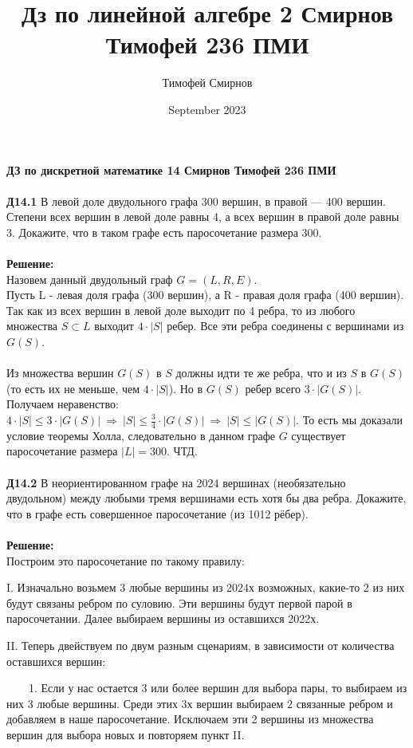 \documentclass[a4paper, 12pt]{article}
\title{Дз по линейной алгебре 2 Смирнов Тимофей 236 ПМИ}
\author{Тимофей Смирнов}
\date{September 2023}
\begin{document}
    {\center \bf \large ДЗ по дискретной математике 14 Смирнов Тимофей 236 ПМИ}
    \\
    \\ \textbf{Д14.1} В левой доле двудольного графа 300 вершин, в правой — 400 вершин. Степени всех вершин
    в левой доле равны 4, а всех вершин в правой доле равны 3. Докажите, что в таком графе есть
    паросочетание размера 300.
    \\
    \\ \textbf{Решение: }
    \\ Назовем данный двудольный граф $G = (L, R, E)$. 
    \\ Пусть L - левая доля графа (300 вершин), а R - правая доля графа (400 вершин). Так как из всех вершин в левой доле выходит по 4 ребра, то из любого множества $ S \subset L$ выходит $4 \cdot |S|$ ребер. Все эти ребра соединены с вершинами из $G(S)$.
    \\
    \\ Из множества вершин $G(S)$ в $S$ должны идти те же ребра, что и из $S$ в $G(S)$ (то есть их не меньше, чем $4 \cdot |S|$). Но в $G(S)$ ребер всего $3 \cdot |G(S)|$. Получаем неравенство: $4 \cdot |S| \leq 3 \cdot |G(S)| \ \Rightarrow \ |S| \leq \frac{3}{4} \cdot |G(S)| \ \Rightarrow \ |S| \leq |G(S)|$. То есть мы доказали условие теоремы Холла, следовательно в данном графе $G$ существует паросочетание размера $|L| = 300$. ЧТД.
    \\
    \\ \textbf{Д14.2} В неориентированном графе на 2024 вершинах (необязательно двудольном) между любыми
    тремя вершинами есть хотя бы два ребра. Докажите, что в графе есть совершенное паросочетание (из
    1012 рёбер).
    \\
    \\ \textbf{Решение: }
    \\ Построим это паросочетание по такому правилу:
    \par I. Изначально возьмем 3 любые вершины из 2024х возможных, какие-то 2 из них будут связаны ребром по суловию. Эти вершины будут первой парой в паросочетании. Далее выбираем вершины из оставшихся 2022х.
    \par II. Теперь двействуем по двум разным сценариям, в зависимости от количества оставшихся вершин:
    \par \ \ \ \ 1. Если у нас остается 3 или более вершин для выбора пары, то выбираем из них 3 любые вершины. Среди этих 3х вершин выбираем 2 связанные ребром и добавляем в наше паросочетание. Исключаем эти 2 вершины из множества вершин для выбора новых и повторяем пункт II.
\end{document}
